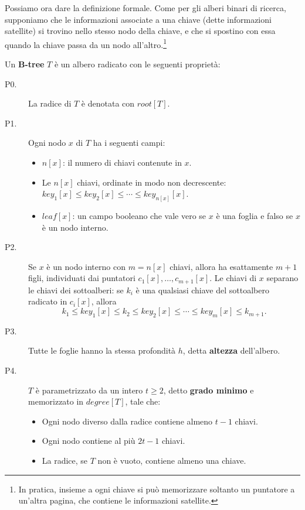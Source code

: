 Possiamo ora dare la definizione formale. Come per gli alberi binari di ricerca, supponiamo che le informazioni associate a una chiave (dette informazioni satellite) si trovino nello stesso nodo della chiave, e che si spostino con essa quando la chiave passa da un nodo all'altro.\footnote{In pratica, insieme a ogni chiave si può memorizzare soltanto un puntatore a un'altra pagina, che contiene le informazioni satellite.}

\begin{definizione}[B-tree]\label{def:btree}
Un \textbf{B-tree} $T$ è un albero radicato con le seguenti proprietà:
\begin{description}
    \item[P0.] La radice di $T$ è denotata con $\mathit{root}[T]$.
    \item[P1.] Ogni nodo $x$ di $T$ ha i seguenti campi:
    \begin{itemize}
        \item $n[x]$: il numero di chiavi contenute in $x$.
        \item Le $n[x]$ chiavi, ordinate in modo non decrescente: $\mathit{key}_1[x] \le \mathit{key}_2[x] \le \cdots \le \mathit{key}_{n[x]}[x]$.
        \item $\mathit{leaf}[x]$: un campo booleano che vale vero se $x$ è una foglia e falso se $x$ è un nodo interno.
    \end{itemize}
    \item[P2.] Se $x$ è un nodo interno con $m = n[x]$ chiavi, allora ha esattamente $m+1$ figli, individuati dai puntatori $c_1[x], \ldots, c_{m+1}[x]$. Le chiavi di $x$ separano le chiavi dei sottoalberi: se $k_i$ è una qualsiasi chiave del sottoalbero radicato in $c_i[x]$, allora
    \[
    k_1 \le \mathit{key}_1[x] \le k_2 \le \mathit{key}_2[x] \le \cdots \le \mathit{key}_m[x] \le k_{m+1}.
    \]
    \item[P3.] Tutte le foglie hanno la stessa profondità $h$, detta \textbf{altezza} dell'albero.
    \item[P4.] $T$ è parametrizzato da un intero $t \ge 2$, detto \textbf{grado minimo} e memorizzato in $\mathit{degree}[T]$, tale che:
    \begin{itemize}
        \item Ogni nodo diverso dalla radice contiene almeno $t-1$ chiavi.
        \item Ogni nodo contiene al più $2t-1$ chiavi.
        \item La radice, se $T$ non è vuoto, contiene almeno una chiave.
    \end{itemize}
\end{description}
\end{definizione}

